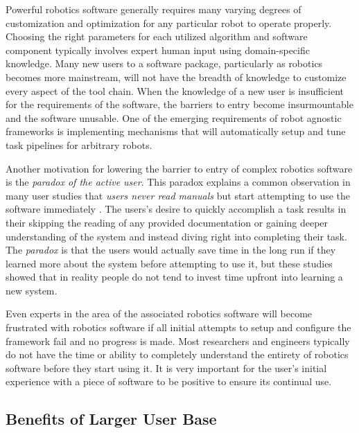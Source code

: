 \documentclass[10pt,journal,compsoc]{joser1}
\begin{document}
{Powerful robotics software generally requires many varying degrees of customization and optimization for any particular robot to operate properly. Choosing the right parameters for each utilized algorithm and software component typically involves expert human input using domain-specific knowledge. Many new users to a software package, particularly as robotics becomes more mainstream, will not have the breadth of knowledge to customize every aspect of the tool chain. When the knowledge of a new user is insufficient for the requirements of the software, the barriers to entry become insurmountable and the software unusable. One of the emerging requirements of robot agnostic frameworks is implementing mechanisms that will automatically setup and tune task pipelines for arbitrary robots.

Another motivation for lowering the barrier to entry of complex robotics software is the \textit{paradox of the active user}. This paradox explains a common observation in many user studies that \textit{users never read manuals} but start attempting to use the software immediately \cite{carroll1987interfacing}. The users's desire to quickly accomplish a task results in their skipping the reading of any provided documentation or gaining deeper understanding of the system and instead diving right into completing their task. The \textit{paradox} is that the users would actually save time in the long run if they learned more about the system before attempting to use it, but these studies showed that in reality people do not tend to invest time upfront into learning a new system.

Even experts in the area of the associated robotics software will become frustrated with robotics software if all initial attempts to setup and configure the framework fail and no progress is made. Most researchers and engineers typically do not have the time or ability to completely understand the entirety of robotics software before they start using it. It is very important for the user's initial experience with a piece of software to be positive to ensure its continual use.

\subsection{Benefits of Larger User Base}

}
\end{document}
